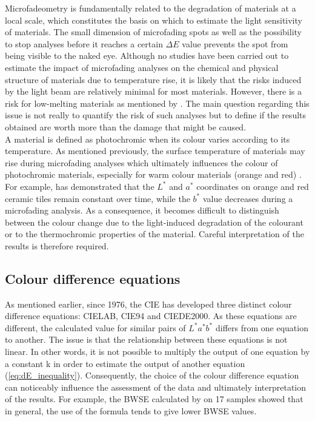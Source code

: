 Microfadeometry is fundamentally related to the degradation of materials at a local scale, which constitutes the basis on which to estimate the light sensitivity of materials. The small dimension of microfading spots as well as the possibility to stop analyses before it reaches a certain $\Delta E$ value prevents the spot from being visible to the naked eye. Although no studies have been carried out to estimate the impact of microfading analyses on the chemical and physical structure of materials due to temperature rise, it is likely that the risks induced by the light beam are relatively minimal for most materials. However, there is a risk for low-melting materials as mentioned by \citet[405]{whitmore_predicting_1999}. The main question regarding this issue is not really to quantify the risk of such analyses but to define if the results obtained are worth more than the damage that might be caused.\\




A material is defined as photochromic when its colour varies according to its temperature. As mentioned previously, the surface temperature of materials may rise during microfading analyses which ultimately influences the colour of photochromic materials, especially for warm colour materials (orange and red) \citep[93]{malkin_bcranpl_1997}. For example, \citep[141-4]{del_hoyo-melendez_study_2010} has demonstrated that the $L^*$ and $a^*$ coordinates on orange and red ceramic tiles remain constant over time, while the $b^*$ value decreases during a microfading analysis. As a consequence, it becomes difficult to distinguish between the colour change due to the light-induced degradation of the colourant or to the thermochromic properties of the material. Careful interpretation of the results is therefore required.\\


\subsection{Colour difference equations}

As mentioned earlier, since 1976, the \gls{CIE} has developed three distinct colour difference equations: CIELAB, CIE94 and CIEDE2000. As these equations are different, the calculated value for similar pairs of $L^*a^*b^*$ differs from one equation to another. The issue is that the relationship between these equations is not linear. In other words, it is not possible to multiply the output of one equation by a constant k in order to estimate the output of another equation (\ref{eq:dE_inequality}). Consequently, the choice of the colour difference equation can noticeably influence the assessment of the data and ultimately interpretation of the results. For example, the \gls{BWSE} calculated by \citet[23, Table 3]{druzik_comparison_2010} on 17 samples showed that in general, the use of the \dEOO formula tends to give lower \gls{BWSE} values.


